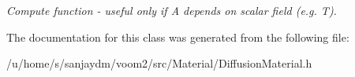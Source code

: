 \begin{DoxyCompactItemize}
\begin{DoxyCompactList}\small\item\em Compute function -\/ useful only if A depends on scalar field (e.g. T). \item\end{DoxyCompactList}\end{DoxyCompactItemize}


The documentation for this class was generated from the following file:\begin{DoxyCompactItemize}
\item 
/u/home/s/sanjaydm/voom2/src/Material/DiffusionMaterial.h\end{DoxyCompactItemize}
